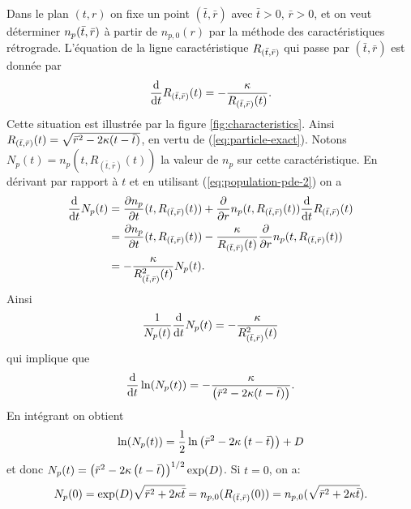Dans le plan $(t, r)$ on fixe un point $(\bar t, \bar r)$ avec $\bar t
> 0$, $\bar r > 0$, et on veut déterminer $n_p(\bar t, \bar
r)$ à partir de $n_{p,0}(r)$ par la méthode des caractéristiques rétrograde.
L'équation de la ligne caractéristique $R_{(\bar t, \bar r)}$ qui passe par $(\bar t,
\bar r)$ est donnée par
\begin{equation*}
\frac{\mathrm d}{\mathrm dt}R_{(\bar t, \bar r)}(t) =
-\frac{\kappa}{R_{(\bar t, \bar r)}(t)}.
\end{equation*}
Cette situation est illustrée par la figure \ref{fig:characteristics}.
Ainsi $R_{(\bar t, \bar r)}(t) = \sqrt{\bar r^2 - 2\kappa (t
  - \bar t)}$, en vertu de (\ref{eq:particle-exact}). Notons $N_p(t) =
n_p(t, R_{(\bar t, \bar r)}(t))$ la valeur de $n_p$ sur cette
caractéristique. En dérivant par rapport à $t$ et en utilisant
(\ref{eq:population-pde-2}) on a
\begin{align*}
  \frac{\mathrm d}{\mathrm dt}N_p(t) %
  &= \frac{\partial n_p}{\partial t}(t, \rcharacteristic(t)) %
  + \frac{\partial}{\partial r}n_p(t,\rcharacteristic(t)) %
    \frac{\mathrm d}{\mathrm dt}\rcharacteristic(t)\\
  &= \frac{\partial n_p}{\partial t}(t, \rcharacteristic(t))
     - \frac{\dissolutionrate}{\rcharacteristic(t)}\frac{\partial}{\partial r} n_p(t, \rcharacteristic(t))\\
  &= -\frac{\dissolutionrate}{R_{(\bar t, \bar r)}^2(t)}N_p(t). %
\end{align*}
Ainsi
\begin{equation*}
  \frac{1}{N_p(t)}\frac{\mathrm d}{\mathrm dt}N_p(t) =
  -\frac{\kappa}{R^2_{(\bar t, \bar r)}(t)}
\end{equation*}
qui implique que
\begin{equation*}
  \frac{\mathrm d}{\mathrm dt}\ln(N_p(t)) =
  -\frac{\kappa}{\left( \bar r^2 - 2\kappa (t - \bar t) \right)}.
\end{equation*}
En intégrant on obtient
\begin{equation*}
  \ln(N_p(t)) = \frac{1}{2}\ln\left( \bar r^2 -
    2\kappa\left( t - \bar t \right) \right) + D
\end{equation*}
et donc
$N_p(t) = \left( \bar r^2 - 2\kappa\left( t - \bar t \right) \right)^{1/2} \exp(D)$. Si $t = 0$, on a:
\begin{equation*}
  N_p(0) = \exp(D)\sqrt{\bar r^2 +
    2\kappa \bar t} = n_{p,0}(R_{(\bar t, \bar r)}(0)) = n_{p,0}(\sqrt{\bar r^2 +
    2\kappa \bar t}).
\end{equation*}
